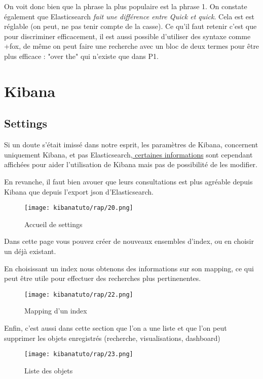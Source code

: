 On voit donc bien que la phrase la plus populaire est la phrase 1. On constate également
que Elasticsearch \emph{fait une différence entre \emph{Quick} et \emph{quick}}. 
Cela est est réglable (on peut, ne pas tenir compte de la casse).
Ce qu'il faut retenir c'est que pour discriminer efficacement, il est aussi possible
d'utiliser des syntaxe comme +fox, de même on peut faire une recherche avec un bloc
de deux termes pour être plus efficace : "over the" qui n'existe que dans P1.

\section{Kibana}
\subsection{Settings}
\label{subsec:settings}
Si un doute s'était imissé dans notre esprit, les paramètres de Kibana, concernent
uniquement Kibana, et pas Elasticsearch,\hyperref[fig:kibanatuto14]{ certaines informations} 
sont cependant affichées pour aider l'utilisation de Kibana mais pas de possibilité 
de les modifier.

En revanche, il faut bien avouer que leurs consultations est plus agréable depuis 
Kibana que depuis l'export json d'Elasticsearch.

\begin{figure}[H]
\center
\texttt{[image: kibanatuto/rap/20.png]}
\label{fig:kibanatuto13}
\caption{Accueil de settings}
\end{figure}

Dans cette page vous pouvez créer de nouveaux ensembles d'index, ou en choisir un 
déjà existant.

En choisissant un index nous obtenons des informations sur son mapping, ce qui peut 
être utile pour effectuer des recherches plus pertinenentes.


\begin{figure}[H]
\center
\texttt{[image: kibanatuto/rap/22.png]}
\label{fig:kibanatuto14}
\caption{Mapping d'un index}
\end{figure}

Enfin, c'est aussi dans cette section que l'on a une liste et que l'on peut supprimer les 
objets enregistrés (recherche, visualisations, dashboard)

\begin{figure}[H]
\center
\texttt{[image: kibanatuto/rap/23.png]}
\label{fig:kibanatuto15}
\caption{Liste des objets}
\end{figure}

